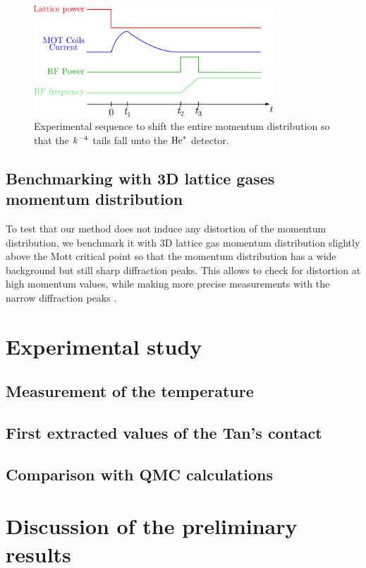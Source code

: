 \begin{figure}
    \centering
    \includegraphics[width=0.8\textwidth]{Fig/Chapter5/displacement_sequence.png}
    \caption{Experimental sequence to shift the entire momentum distribution so that the $k^{-4}$ tails fall unto the $\mathrm{He}^*$ detector.}
    \label{fig:displacement_sequence}
\end{figure}

\subsection{Benchmarking with 3D lattice gases momentum distribution}

To test that our method does not induce any distortion of the momentum distribution, we benchmark it with 3D lattice gas momentum distribution slightly above the Mott critical point so that the momentum distribution has a wide background but still sharp diffraction peaks. This allows to check for distortion at high momentum values, while making more precise measurements with the narrow diffraction peaks .





\section{Experimental study}

\subsection{Measurement of the temperature}

\subsection{First extracted values of the Tan's contact}

\subsection{Comparison with QMC calculations}

\section{Discussion of the preliminary results}